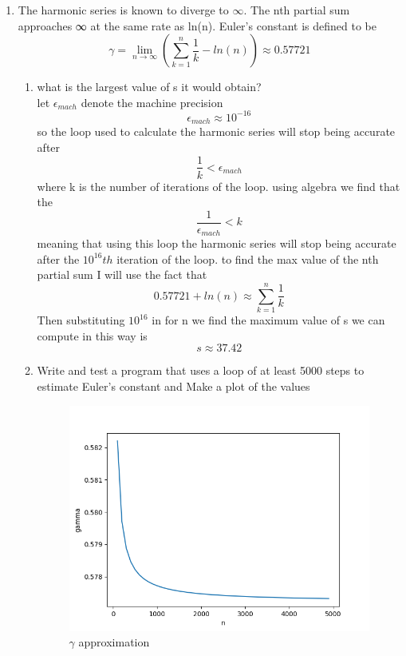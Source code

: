 \documentclass{article}
\begin{document}
\begin{enumerate}
\item The harmonic series is known to diverge to $\infty$. The nth partial sum approaches ∞ at the same rate as ln(n). Euler’s constant is defined to be
$$\gamma = \lim_{n \to \infty } \left( \sum_{k=1}^{n}\frac{1}{k} - ln(n) \right)\approx 0.57721$$
\begin{enumerate}
    \item what is the largest value of s it would obtain? \\let $\epsilon_{mach} $ denote the machine precision   $$\epsilon_{mach} \approx 10^{-16}$$ 
    so the loop used to calculate the harmonic series will stop being accurate after $$ \frac{1}{k} < \epsilon_{mach}$$ where k is the number of iterations of the loop. 
    using algebra we find that the $$\frac{1}{\epsilon_{mach}} < k$$ meaning that using this loop the harmonic series will stop being accurate after the $10^{16}th$ iteration of the loop. to find the max value of the nth partial sum I will use the fact that $$0.57721+ln(n)\approx \sum_{k=1}^{n}\frac{1}{k}$$ Then substituting $10^{16}$ in for n we find the maximum value of s we can compute in this way is $$s \approx 37.42$$
    \item Write and test a program that uses a loop of at least 5000 steps to estimate Euler’s constant and Make a plot of the values
\begin{figure}[hbt!]
        \centering
        \includegraphics[width=1\linewidth]{gamma.png}
        \caption{$\gamma $ approximation}
        \label{fig:\gamma approximation}
    \end{figure}
    

\end{enumerate}
\end{enumerate}
\end{document}
